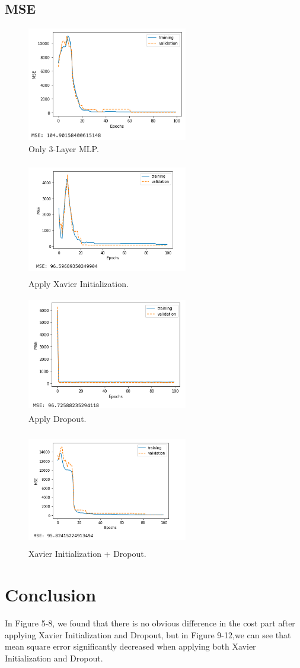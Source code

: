 \documentclass[conference]{IEEEtran}
\begin{document}
\subsection{MSE}
\begin{figure}[htbp]
\centerline{\includegraphics[width=7cm, height=5cm]{3-mse.png}}
\caption{Only 3-Layer MLP.}
\label{mse}
\end{figure}
\begin{figure}[htbp]
\centerline{\includegraphics[width=7cm, height=5cm]{3-xav-mse.png}}
\caption{Apply Xavier Initialization.}
\label{mse_xav}
\end{figure}
\begin{figure}[htbp]
\centerline{\includegraphics[width=7cm, height=5cm]{3-drop-mse.png}}
\caption{Apply Dropout.}
\label{mse_dropout}
\end{figure}
\newpage
\begin{figure}[htbp]
\centerline{\includegraphics[width=7cm, height=5cm]{3-all-mse.png}}
\caption{Xavier Initialization + Dropout.}
\label{mse_all}
\end{figure}

\section{Conclusion}
In Figure 5-8, we found that there is no obvious difference in the cost part after applying Xavier Initialization and Dropout, but in Figure 9-12,we can see that mean square error significantly decreased when applying both Xavier Initialization and Dropout.
\end{document}
